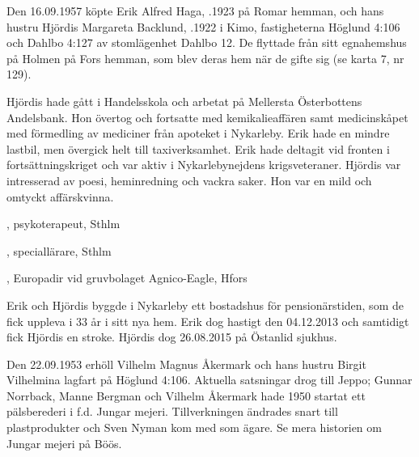Den 16.09.1957 köpte Erik Alfred Haga, .1923 på Romar	hemman, och hans hustru Hjördis Margareta Backlund, .1922 i Kimo, fastigheterna Höglund 4:106 och Dahlbo 4:127 av stomlägenhet Dahlbo 12. De flyttade från sitt egnahemshus på Holmen på	Fors hemman, som blev	deras hem när de gifte sig (se karta 7, nr 129).

Hjördis hade gått i	Handelsskola och arbetat på Mellersta Österbottens Andelsbank. Hon övertog och fortsatte med kemikalieaffären samt medicinskåpet med	förmedling av mediciner från apoteket i Nykarleby. Erik hade en mindre lastbil, men övergick helt till taxiverksamhet. Erik hade deltagit vid	fronten i fortsättningskriget och var aktiv i Nykarlebynejdens krigsveteraner. Hjördis var intresserad av poesi, heminredning och	vackra saker. Hon var en mild och omtyckt affärskvinna.
\begin{jhchildren}
  \item {}, psykoterapeut, Sthlm
  \item {}, speciallärare, Sthlm
  \item {}, Europadir vid  gruvbolaget Agnico-Eagle, Hfors
\end{jhchildren}
Erik och Hjördis byggde i Nykarleby ett bostadshus för pensionärstiden,	som de fick uppleva i 33 år i sitt nya hem. Erik dog hastigt den 04.12.2013 och samtidigt fick Hjördis en stroke. Hjördis dog 26.08.2015 på Östanlid sjukhus.


Den 22.09.1953 erhöll Vilhelm Magnus Åkermark och hans hustru	Birgit Vilhelmina lagfart på Höglund 4:106. Aktuella satsningar drog till Jeppo; Gunnar Norrback, Manne Bergman och Vilhelm Åkermark hade 1950 startat ett pälsberederi i f.d. Jungar mejeri. Tillverkningen ändrades snart till plastprodukter och Sven Nyman kom med som ägare. Se mera historien om Jungar mejeri på Böös.

